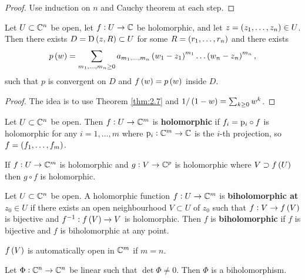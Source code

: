 \begin{proof}
Use induction on $ n $ and Cauchy theorem at each step.
\end{proof}

\begin{corollary}
Let $ U \subset \mathbb{C}^n $ be open, let $ f : U \to \mathbb{C} $ be holomorphic, and let $ z = \br{z_1, \dots, z_n} \in U $. Then there exists $ D = \D\br{z, R} \subset U $ for some $ R = \br{r_1, \dots, r_n} $ and there exists
$$ p\br{w} = \sum_{m_1, \dots, m_n \ge 0} a_{m_1, \dots, m_n} \br{w_1 - z_1}^{m_1} \dots \br{w_n - z_n}^{m_n}, $$
such that $ p $ is convergent on $ D $ and $ f\br{w} = p\br{w} $ inside $ D $.
\end{corollary}

\begin{proof}
The idea is to use Theorem \ref{thm:2.7} and $ 1 / \br{1 - w} = \sum_{k \ge 0} w^k $.
\end{proof}

\begin{definition}
Let $ U \subset \mathbb{C}^n $ be open. Then $ f : U \to \mathbb{C}^m $ is \textbf{holomorphic} if $ f_i = \mathrm{p}_i \circ f $ is holomorphic for any $ i = 1, \dots, m $ where $ \mathrm{p}_i : \mathbb{C}^m \to \mathbb{C} $ is the $ i $-th projection, so $ f = \br{f_1, \dots, f_m} $.
\end{definition}

\begin{fact*}
If $ f : U \to \mathbb{C}^m $ is holomorphic and $ g : V \to \mathbb{C}^p $ is holomorphic where $ V \supset f\br{U} $ then $ g \circ f $ is holomorphic.
\end{fact*}

\begin{definition}
Let $ U \subset \mathbb{C}^n $ be open. A holomorphic function $ f : U \to \mathbb{C}^m $ is \textbf{biholomorphic at $ z_0 \in U $} if there exists an open neighbourhood $ V \subset U $ of $ z_0 $ such that $ f : V \to f\br{V} $ is bijective and $ f^{-1} : f\br{V} \to V $ is holomorphic. Then $ f $ is \textbf{biholomorphic} if $ f $ is bijective and $ f $ is biholomorphic at any point.
\end{definition}

\begin{note*}
$ f\br{V} $ is automatically open in $ \mathbb{C}^m $ if $ m = n $.
\end{note*}

\pagebreak

\begin{example}
Let $ \Phi : \mathbb{C}^n \to \mathbb{C}^n $ be linear such that $ \det \Phi \ne 0 $. Then $ \Phi $ is a biholomorphism.
\end{example}

